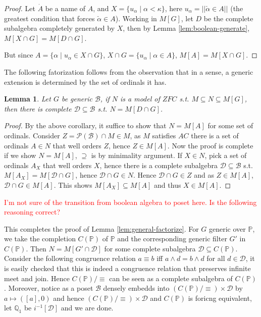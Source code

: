 \documentclass{article}
\newtheorem{lemma}{Lemma}
\newcommand{\bbP}{\mathbb{P}}
\newcommand{\bbQ}{\mathbb{Q}}
\begin{document}
\begin{proof}
    Let $\dot{A}$ be a name of $A$, and $X = \{u_\alpha\mid \alpha<\kappa\}$, here $u_\alpha = ||\check{\alpha}\in A||$ (the greatest condition that forces $\check{\alpha}\in A$). Working in $M[G]$, let $D$ be the complete subalgebra completely generated by $X$, then by Lemma \ref{lem:boolean-generate}, $M[X\cap G] = M[D\cap G]$.

    But since $A = \{\alpha\mid u_\alpha\in X\cap G\}$, $X\cap G = \{u_\alpha\mid \alpha\in A\}$, $M[A] = M[X\cap G]$.
\end{proof}

The following fatorization follows from the observation that in a sense, a generic extension is determined by the set of ordinals it has.

\begin{lemma}
    Let $G$ be generic $\mathcal{B}$, if $N$ is a model of $ZFC$ s.t. $M\subseteq N\subseteq M[G] $, then there is complete $\mathcal{D}\subseteq \mathcal{B}$ s.t. $N = M[D\cap G]$.
\end{lemma}

\begin{proof}
    By the above corollary, it suffice to show that $N = M[A]$ for some set of ordinals. Consider $Z = \mathcal{P}(\mathcal{B})\cap M\in M$, as $M$ satisfies $AC$ there is a set of ordinals $A\in N$ that well orders $Z$, hence $Z\in M[A]$. Now the proof is complete if we show $N = M[A]$, $\supseteq$ is by minimality argument. If $X\in N$, pick a set of ordinals $A_X$ that well orders $X$, hence there is a complete subalgebra $\mathcal{D}\subseteq \mathcal{B}$ s.t. $M[A_X] = M[\mathcal{D}\cap G]$, hence $\mathcal{D}\cap G\in N$. Hence $\mathcal{D}\cap G\in Z $ and as $Z\in M[A]$, $\mathcal{D}\cap G\in M[A]$. This shows $M[A_X]\subseteq M[A]$ and thus $X\in M[A]$.
\end{proof}

\textcolor{red}{I'm not sure of the transition from boolean algebra to poset here. Is the following reasoning correct?}

This completes the proof of Lemma \ref{lem:general-factorize}. For $G$ generic over $\bbP$, we take the completion $C(\bbP)$ of $\bbP$ and the corresponding generic filter $G'$ in $C(\bbP)$. Then $N = M[G'\cap \mathcal{D}]$ for some complete subalgebra $\mathcal{D}\subseteq C(\bbP)$. Consider the following congruence relation $a \equiv b$ iff $a\land d = b\land d$ for all $d\in \mathcal{D}$, it is easily checked that this is indeed a congruence relation that preserves infinite meet and join. Hence $C(\bbP)/\equiv$ can be seen as a complete subalgebra of $C(\bbP)$. Moreover, notice as a poset $\mathcal{B}$ densely embedds into $(C(\bbP)/\equiv)\times \mathcal{D}$ by $a\mapsto ([a],0)$ and hence $(C(\bbP)/\equiv)\times \mathcal{D}$ and $C(\bbP)$ is foricng equivalent, let $\bbQ_1$ be $i^{-1}[\mathcal{D}]$ and we are done. 




\end{document}

